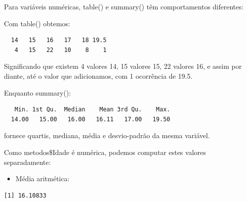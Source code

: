 \documentclass[
]{article}
\newenvironment{Shaded}{\begin{snugshade}}{\end{snugshade}}
\newcommand{\FunctionTok}[1]{\textcolor[rgb]{0.00,0.00,0.00}{#1}}
\newcommand{\NormalTok}[1]{#1}
\newcommand{\OtherTok}[1]{\textcolor[rgb]{0.56,0.35,0.01}{#1}}
\newcommand{\SpecialCharTok}[1]{\textcolor[rgb]{0.00,0.00,0.00}{#1}}
\providecommand{\tightlist}{%
  \setlength{\itemsep}{0pt}\setlength{\parskip}{0pt}}
\begin{document}
Para variáveis numéricas, table() e summary() têm comportamentos
diferentes:

Com table() obtemos:

\begin{Shaded}
\end{Shaded}

\begin{verbatim}
  14   15   16   17   18 19.5 
   4   15   22   10    8    1 
\end{verbatim}

Significando que existem 4 valores 14, 15 valores 15, 22 valores 16, e
assim por diante, até o valor que adicionamos, com 1 ocorrência de 19.5.

Enquanto summary():

\begin{Shaded}
\end{Shaded}

\begin{verbatim}
   Min. 1st Qu.  Median    Mean 3rd Qu.    Max. 
  14.00   15.00   16.00   16.11   17.00   19.50 
\end{verbatim}

fornece quartis, mediana, média e desvio-padrão da mesma variável.

Como metodos\$Idade é numérica, podemos computar estes valores
separadamente:

\begin{itemize}
\tightlist
\item
  Média aritmética:
\end{itemize}

\begin{Shaded}
\end{Shaded}

\begin{verbatim}
[1] 16.10833
\end{verbatim}
\end{document}
